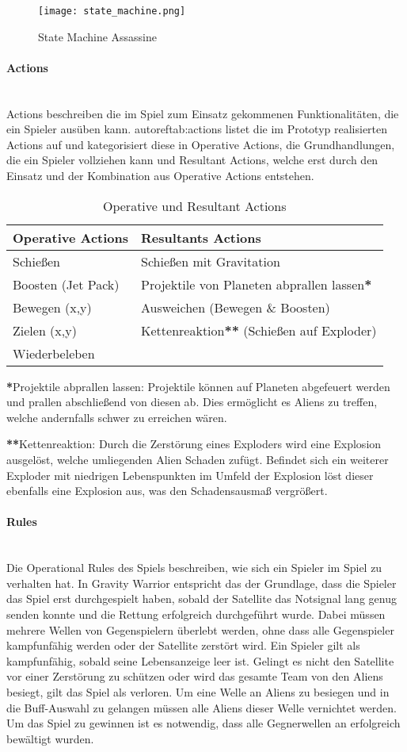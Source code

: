 \documentclass[11pt]{scrartcl}
\newcommand{\lbparagraph}[1]{\paragraph*{#1}\mbox{}\\}
\begin{document}
\begin{figure}[htp]
	\centering
	\texttt{[image: state\_machine.png]}
	\caption{State Machine Assassine}
	\label{fig:state_machine}
\end{figure}

\lbparagraph{Actions}
Actions beschreiben die im Spiel zum Einsatz gekommenen Funktionalitäten, die ein Spieler ausüben kann. autoref{tab:actions} listet die im Prototyp realisierten Actions auf und kategorisiert diese in Operative Actions, die Grundhandlungen, die ein Spieler vollziehen kann und Resultant Actions, welche erst durch den Einsatz und der Kombination aus Operative Actions entstehen.


\begin{table}[htp]
\centering
\begin{tabular}{|l|l|}
\hline
\textbf{Operative Actions}&\textbf{Resultants Actions} \\
\hline
Schießen&Schießen mit Gravitation \\
\hline
Boosten (Jet Pack)&Projektile von Planeten abprallen lassen\textbf{*}\\
\hline
Bewegen (x,y)&Ausweichen (Bewegen \& Boosten)\\
\hline
Zielen (x,y)&Kettenreaktion\textbf{**} (Schießen auf Exploder)\\
\hline
Wiederbeleben&\\
\hline
\end{tabular}
\caption{Operative und Resultant Actions}
\label{tab:actions}
\end{table}

\textbf{*}Projektile abprallen lassen: Projektile können auf Planeten abgefeuert werden und prallen abschließend von diesen ab. Dies ermöglicht es Aliens zu treffen, welche andernfalls schwer zu erreichen wären.

\textbf{**}Kettenreaktion: Durch die Zerstörung eines Exploders wird eine Explosion ausgelöst, welche umliegenden Alien Schaden zufügt. Befindet sich ein weiterer Exploder mit niedrigen Lebenspunkten im Umfeld der Explosion löst dieser ebenfalls eine Explosion aus, was den Schadensausmaß vergrößert. 


\lbparagraph{Rules}
Die Operational Rules des Spiels beschreiben, wie sich ein Spieler im Spiel zu verhalten hat\cite{K2011}. In Gravity Warrior entspricht das der Grundlage, dass die Spieler das Spiel erst durchgespielt haben, sobald der Satellite das Notsignal lang genug senden konnte und die Rettung erfolgreich durchgeführt wurde. Dabei müssen mehrere Wellen von Gegenspielern überlebt werden, ohne dass alle Gegenspieler kampfunfähig werden oder der Satellite zerstört wird. Ein Spieler gilt als kampfunfähig, sobald seine Lebensanzeige leer ist. Gelingt es nicht den Satellite vor einer Zerstörung zu schützen oder wird das gesamte Team von den Aliens besiegt, gilt das Spiel als verloren. Um eine Welle an Aliens zu besiegen und in die Buff-Auswahl zu gelangen müssen alle Aliens dieser Welle vernichtet werden. Um das Spiel zu gewinnen ist es notwendig, dass alle Gegnerwellen an erfolgreich bewältigt wurden.
\end{document}
